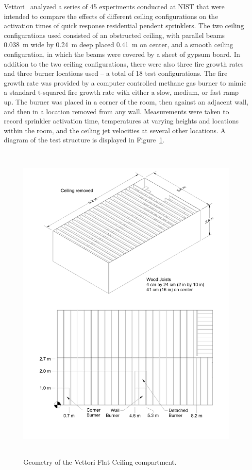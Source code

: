 Vettori~\cite{Vettori:1} analyzed a series of 45 experiments conducted at NIST that were intended to compare the effects of different ceiling configurations on the activation times of quick response residential pendent sprinklers. The two ceiling configurations used consisted of an obstructed ceiling, with parallel beams 0.038~m wide by 0.24~m deep placed 0.41~m on center, and a smooth ceiling configuration, in which the beams were covered by a sheet of gypsum board.  In addition to the two ceiling configurations, there were also three fire growth rates and three burner locations used -- a total of 18 test configurations. The fire growth rate was provided by a computer controlled methane gas burner to mimic a standard t-squared fire growth rate with either a slow, medium, or fast ramp up. The burner was placed in a corner of the room, then against an adjacent wall, and then in a location removed from any wall. Measurements were taken to record sprinkler activation time, temperatures at varying heights and locations within the room, and the ceiling jet velocities at several other locations.  A diagram of the test structure is displayed in Figure~\ref{Vettori_Drawing}.

\begin{figure}
\begin{center}
\includegraphics[height=6.5in]{FIGURES/Vettori_Flat_Ceiling/Vettori_Flat_Ceiling}
\end{center}
\caption[Geometry of the Vettori Flat Ceiling compartment]{Geometry of the Vettori Flat Ceiling compartment.}
\label{Vettori_Drawing}
\end{figure}


